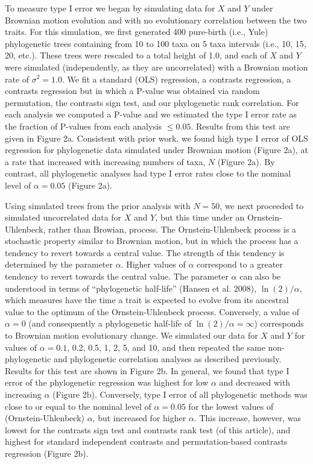 \documentclass[fleqn,10pt,lineno]{wlpeerj} %
\begin{document}
To measure type I error we began by simulating data for \(X\) and \(Y\) under Brownian motion evolution and with no evolutionary correlation between the two traits. For this simulation, we first generated 400 pure-birth (i.e., Yule) phylogenetic trees containing from 10 to 100 taxa on 5 taxa intervals (i.e., 10, 15, 20, etc.). These trees were rescaled to a total height of 1.0, and each of \(X\) and \(Y\) were simulated (independently, as they are uncorrelated) with a Brownian motion rate of \(\sigma^2 = 1.0\). We fit a standard (OLS) regression, a contrasts regression, a contrasts regression but in which a P-value was obtained via random permutation, the contrasts sign test, and our phylogenetic rank correlation. For each analysis we computed a P-value and we estimated the type I error rate as the fraction of P-values from each analysis \(\le 0.05\). Results from this test are given in Figure 2a. Consistent with prior work, we found high type I error of OLS regression for phylogenetic data simulated under Brownian motion (Figure 2a), at a rate that increased with increasing numbers of taxa, \(N\) (Figure 2a). By contrast, all phylogenetic analyses had type I error rates close to the nominal level of \(\alpha = 0.05\) (Figure 2a).

Using simulated trees from the prior analysis with \(N = 50\), we next proceeded to simulated uncorrelated data for \(X\) and \(Y\), but this time under an Ornstein-Uhlenbeck, rather than Browian, process. The Ornstein-Uhlenbeck process is a stochastic property similar to Brownian motion, but in which the process has a tendency to revert towards a central value. The strength of this tendency is determined by the parameter \(\alpha\). Higher values of \(\alpha\) correspond to a greater tendency to revert towards the central value. The parameter \(\alpha\) can also be understood in terms of ``phylogenetic half-life'' (Hansen et al. 2008), \(\ln(2)/\alpha\), which measures have the time a trait is expected to evolve from its ancestral value to the optimum of the Ornstein-Uhlenbeck process. Conversely, a value of \(\alpha = 0\) (and consequently a phylogenetic half-life of \(\ln(2)/\alpha = \infty\)) corresponds to Brownian motion evolutionary change. We simulated our data for \(X\) and \(Y\) for values of \(\alpha = 0.1\), 0.2, 0.5, 1, 2, 5, and 10, and then repeated the same non-phylogenetic and phylogenetic correlation analyses as described previously. Results for this test are shown in Figure 2b. In general, we found that type I error of the phylogenetic regression was highest for low \(\alpha\) and decreased with increasing \(\alpha\) (Figure 2b). Conversely, type I error of all phylogenetic methods was close to or equal to the nominal level of \(\alpha = 0.05\) for the lowest values of (Ornstein-Uhlenbeck) \(\alpha\), but increased for higher \(\alpha\). This increase, however, was lowest for the contrasts sign test and contrasts rank test (of this article), and highest for standard independent contrasts and permutation-based contrasts regression (Figure 2b).
\end{document}
